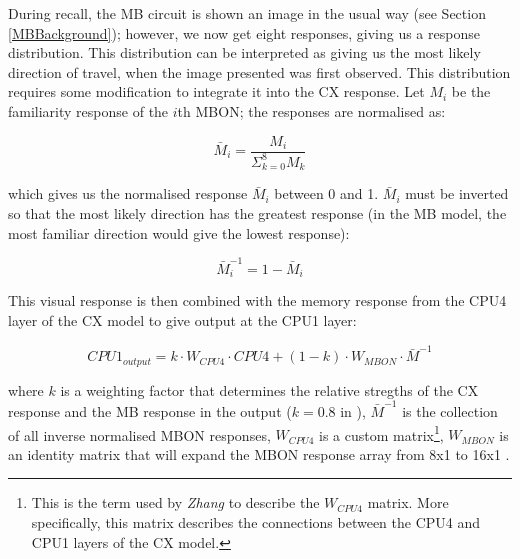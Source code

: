 \documentclass[a4paper,11pt,twoside,openright]{article}
\begin{document}
During recall, the MB circuit is shown an image in the usual way (see
Section \ref{MBBackground}); however, we now get eight responses,
giving us a response distribution. This distribution can be
interpreted as giving us the most likely direction of travel, when the
image presented was first observed. This distribution requires some
modification to integrate it into the CX response. Let $M_i$ be the
familiarity response of the $i$th MBON; the responses are normalised
as:

\begin{equation}
  \bar{M}_i = \frac{M_i}{\Sigma^{8}_{k = 0} M_k}
\end{equation}

which gives us the normalised response $\bar{M}_i$ between 0 and 1. $\bar{M}_i$
must be inverted so that the most likely direction has the greatest response
(in the MB model, the most familiar direction would give the lowest response):

\begin{equation}
  \bar{M}^{-1}_i = 1 - \bar{M}_i
\end{equation}

This visual response is then combined with the memory response from the CPU4
layer of the CX model to give output at the CPU1 layer:

\begin{equation}
  CPU1_{output} = k \cdot W_{CPU4} \cdot CPU4 + (1 - k) \cdot W_{MBON} \cdot
  \bar{M}^{-1}
\end{equation}

where $k$ is a weighting factor that determines the relative stregths of the CX
response and the MB response in the output ($k = 0.8$ in \cite{Zhang2017}),
$\bar{M}^{-1}$ is the collection of all inverse normalised MBON responses,
$W_{CPU4}$ is a custom matrix\footnote{This is the term used by \textit{Zhang} to
  describe   the $W_{CPU4}$ matrix. More specifically, this matrix describes the
  connections between the CPU4 and CPU1 layers of the CX model.}, $W_{MBON}$ is
an identity matrix that will expand the MBON response array from 8x1 to 16x1
\cite{Zhang2017}.
\newline
\par
\end{document}
